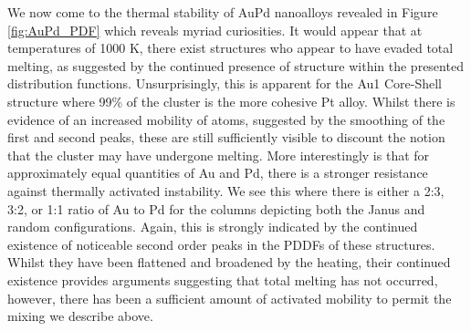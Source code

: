 We now come to the thermal stability of AuPd nanoalloys revealed in Figure \ref{fig:AuPd_PDF} which reveals myriad curiosities. It would appear that at temperatures of 1000 K, there exist structures who appear to have evaded total melting, as suggested by the continued presence of structure within the presented distribution functions. Unsurprisingly, this is apparent for the Au1 Core-Shell structure where 99\% of the cluster is the more cohesive Pt alloy. Whilst there is evidence of an increased mobility of atoms, suggested by the smoothing of the first and second peaks, these are still sufficiently visible to discount the notion that the cluster may have undergone melting. More interestingly is that for approximately equal quantities of Au and Pd, there is a stronger resistance against thermally activated instability. We see this where there is either a 2:3, 3:2, or 1:1 ratio of Au to Pd for the columns depicting both the Janus and random configurations. Again, this is strongly indicated by the continued existence of noticeable second order peaks in the PDDFs of these structures. Whilst they have been flattened and broadened by the heating, their continued existence provides arguments suggesting that total melting has not occurred, however, there has been a sufficient amount of activated mobility to permit the mixing we describe above.
 

